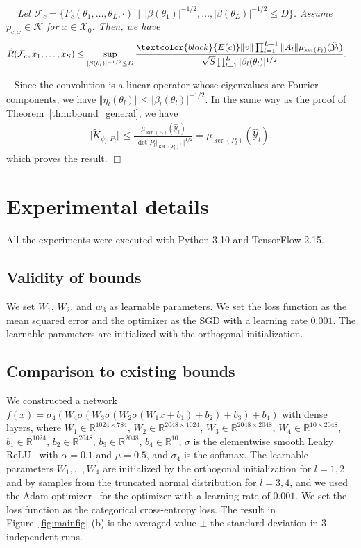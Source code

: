 \documentclass[twoside]{article}
\newenvironment{proof}[1][Proof\ ]{\medskip\noindent{\bf #1}\ }{%
\hfill $\Box$\par\quad\par}
\def\mcl#1{\mathcal{#1}}
\def\opn{\operatorname}
\def\red#1{\textcolor{black}{#1}}
\newenvironment{mythm}[1][]{\medskip\par\noindent{\bfseries #1}\ \,\,\em}{\medskip\par}
\begin{document}
\begin{mythm}[Proposition~\ref{prop:bound_cnn}]
Let $\mcl{F}_c=\{F_c(\theta_1,\ldots,\theta_L,\cdot)\,\mid\,\vert\beta(\theta_1)\vert^{-1/2},\ldots,\vert\beta(\theta_L)\vert^{-1/2}\le D\}$.
Assume $p_{c,x}\in\mcl{K}$ for $x\in \mcl{X}_0$.
Then, we have
\begin{align*}
 \hat{R}(\mcl{F}_c,x_1,\ldots,x_S)&\le \sup_{\vert\beta(\theta_l)\vert^{-1/2}\le D}\frac{\red{E(c)}\Vert v\Vert\prod_{l=1}^{L-1}\Vert A_l\Vert \mu_{\opn{ker}(P_l)}(\hat{\mcl{Y}}_{l})}{\sqrt{S}\prod_{l=1}^L\vert \beta_l(\theta_l) \vert^{1/2}}.
\end{align*}
\end{mythm}
\begin{proof}
Since the convolution is a linear operator whose eigenvalues are Fourier components, we have $\Vert \eta_l(\theta_l)\Vert\le \vert\beta_l(\theta_l)\vert^{-1/2}$.
In the same way as the proof of Theorem~\ref{thm:bound_general}, we have 
\begin{align*}
\Vert \tilde{K}_{\psi_l,P_l}\Vert \le \frac{\mu_{\opn{ker}(P_l)}(\hat{\mcl{Y}}_l)}{\vert\det P_l\vert_{\opn{ker}(P_l)^{\perp}}\vert^{1/2}}
=\mu_{\opn{ker}(P_l)}(\hat{\mcl{Y}}_l),
\end{align*}
which proves the result.
\end{proof}

\section{Experimental details}\label{ap:exp_details}
All the experiments were executed with Python 3.10 and TensorFlow 2.15.

\subsection{Validity of bounds}
We set $W_1$, $W_2$, and $w_3$ as learnable parameters.
We set the loss function as the mean squared error and the optimizer as the SGD with a learning rate $0.001$.
The learnable parameters are initialized with the orthogonal initialization.

\subsection{Comparison to existing bounds}
We constructed a network $f(x)=\sigma_4(W_4\sigma(W_3\sigma(W_2\sigma(W_1x+b_1)+b_2)+b_3)+b_4)$ with dense layers, where $W_1\in\mathbb{R}^{1024\times 784}$, $W_2\in\mathbb{R}^{2048\times 1024}$, $W_3\in\mathbb{R}^{2048\times 2048}$, $W_4\in\mathbb{R}^{10\times 2048}$, $b_1\in\mathbb{R}^{1024}$, $b_2\in\mathbb{R}^{2048}$, $b_3\in\mathbb{R}^{2048}$, $b_4\in\mathbb{R}^{10}$, $\sigma$ is the elementwise smooth Leaky ReLU~\citep{biswas22} with $\alpha=0.1$ and $\mu=0.5$, and $\sigma_4$ is the softmax.
The learnable parameters $W_1,\ldots,W_4$ are initialized by the orthogonal initialization for $l=1,2$ and by samples from the truncated normal distribution for $l=3,4$, and we used the Adam optimizer~\citep{kingma15} for the optimizer with a learning rate of $0.001$.
We set the loss function as the categorical cross-entropy loss.
The result in Figure~\ref{fig:mainfig} (b) is the averaged value $\pm$ the standard deviation in 3 independent runs.
\end{document}
